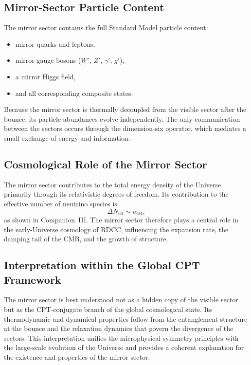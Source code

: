 \documentclass[11pt,a4paper]{article}
\begin{document}
\subsection{Mirror-Sector Particle Content}

The mirror sector contains the full Standard Model particle content:
\begin{itemize}
    \item mirror quarks and leptons,
    \item mirror gauge bosons ($W'$, $Z'$, $\gamma'$, $g'$),
    \item a mirror Higgs field,
    \item and all corresponding composite states.
\end{itemize}
Because the mirror sector is thermally decoupled from the visible sector after the bounce, its particle abundances evolve independently. The only communication between the sectors occurs through the dimension-six operator, which mediates a small exchange of energy and information.

\subsection{Cosmological Role of the Mirror Sector}

The mirror sector contributes to the total energy density of the Universe primarily through its relativistic degrees of freedom. Its contribution to the effective number of neutrino species is
\begin{equation}
    \Delta N_{\mathrm{eff}} \sim \alpha_{\mathrm{IR}},
\end{equation}
as shown in Companion~III. The mirror sector therefore plays a central role in the early-Universe cosmology of RDCC, influencing the expansion rate, the damping tail of the CMB, and the growth of structure.

\subsection{Interpretation within the Global CPT Framework}

The mirror sector is best understood not as a hidden copy of the visible sector but as the CPT-conjugate branch of the global cosmological state. Its thermodynamic and dynamical properties follow from the entanglement structure at the bounce and the relaxation dynamics that govern the divergence of the sectors. This interpretation unifies the microphysical symmetry principles with the large-scale evolution of the Universe and provides a coherent explanation for the existence and properties of the mirror sector.
\end{document}
